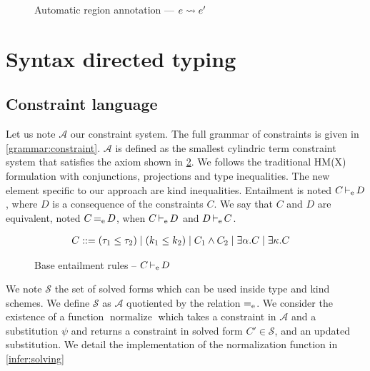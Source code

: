 \begin{figure*}[!hbt]
  \centering
  
  \caption{Automatic region annotation --- $e \rightsquigarrow e'$}
  \label{fig:region-annotation}
\end{figure*}

\section{Syntax directed typing}
\label{appendix:sdtyping}

\subsection{Constraint language}

\newcommand\A{\mathcal A}
\newcommand\SC{\mathcal S}

Let us note $\A$ our constraint system. The full grammar of constraints is
given in \cref{grammar:constraint}.
$\A$ is defined as the smallest cylindric term constraint system that
satisfies the axiom shown in \cref{rules:entail}.
We follows the traditional HM(X) formulation
with conjunctions, projections and type inequalities.
The new element specific to our approach are kind inequalities.
Entailment is noted $C \operatorname{\vdash_e} D$, where $D$ is a consequence of the
constraints $C$.
We say that $C$ and $D$ are equivalent, noted $C \operatorname{=_e} D$,
when $C \operatorname{\vdash_e} D$ and $D \operatorname{\vdash_e} C$.

\begin{figure}[btp]
  \centering
  \begin{align*}
    C &::= (\tau_1 \leq \tau_2)
        \mid (k_1 \leq k_2)
        \mid C_1 \wedge C_2
        \mid \exists \alpha.C
        \mid \exists \kappa.C
  \end{align*}
  \caption{The constraint language}
  \label{grammar:constraint}
  
  \caption{Lattice inequalities -- $k \lk_\Lat k'$}
  
  \caption{Base entailment rules -- $C \operatorname{\vdash_e} D$ }
  \label{rules:entail}
\end{figure}


We note $\SC$ the set of solved forms
which can be used inside type and kind schemes.
We define $\SC$ as $\A$ quotiented by the relation $\operatorname{=_e}$.
%
We consider the existence of a function $\operatorname{normalize}$ which takes
a constraint in $\A$ and a substitution $\psi$ and returns a constraint
in solved form $C' \in \SC$,
and an updated substitution. We detail the implementation
of the normalization function in \cref{infer:solving}

